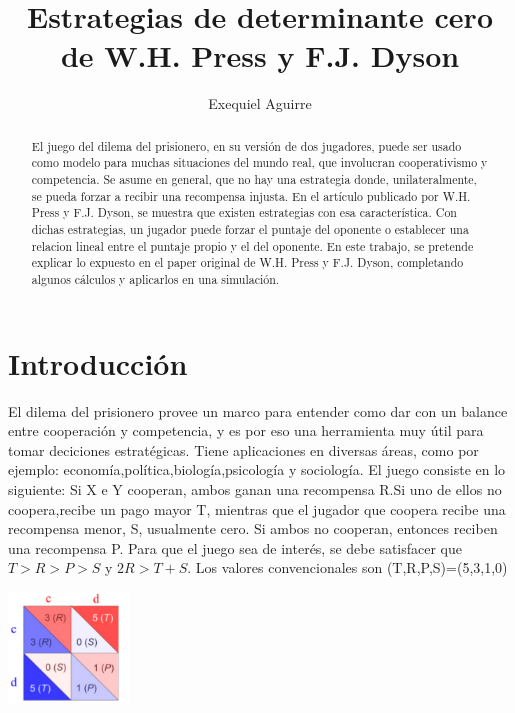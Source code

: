 \documentclass[12pt]{article}
\title{Estrategias de determinante cero de W.H. Press y F.J. Dyson}
\date{}
\author{Exequiel Aguirre}
\begin{document}
\maketitle

\begin{abstract}
El juego del dilema del prisionero, en su versión de dos jugadores, puede ser usado como modelo para 
muchas situaciones del mundo real, que involucran cooperativismo y competencia. Se asume en general, que no hay 
una estrategia donde, unilateralmente, se pueda forzar a recibir una recompensa injusta.\newline
En el artículo publicado por W.H. Press y F.J. Dyson, se muestra que existen estrategias con esa característica.
Con dichas estrategias, un jugador puede forzar el puntaje del oponente o establecer una relacion lineal entre
el puntaje propio y el del oponente.\newline
En este trabajo, se pretende explicar lo expuesto en el paper original de W.H. Press y F.J. Dyson, completando
algunos cálculos y aplicarlos en una simulación.
\end{abstract}




\section{Introducción}
El dilema del prisionero provee un  marco para entender como dar con un balance entre cooperación y competencia, y es
por eso una herramienta muy útil para tomar deciciones estratégicas.
Tiene aplicaciones en diversas áreas, como por ejemplo: economía,política,biología,psicología y sociología.\newline
El juego consiste en lo siguiente:\newline
Si X e Y cooperan, ambos ganan una recompensa R.Si uno de ellos no coopera,recibe un pago mayor T, mientras que el
jugador que coopera recibe una recompensa menor, S, usualmente cero. Si ambos no cooperan, entonces reciben una recompensa P.
Para que el juego sea de interés, se debe satisfacer que $T >  R > P > S$ y $2R > T+S$.
Los valores convencionales son (T,R,P,S)=(5,3,1,0)
\begin{center}
\includegraphics[height=3cm]{./pd.png}
\end{center}
\end{document}
